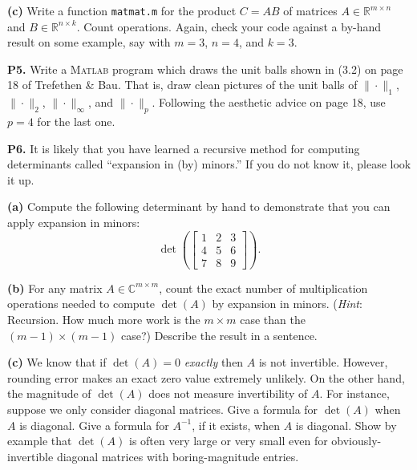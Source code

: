 \documentclass[12pt]{amsart}
\newcommand{\CC}{\mathbb{C}}
\newcommand{\RR}{\mathbb{R}}
\newcommand{\prob}[1]{\bigskip\noindent\textbf{#1.}\quad }
\newcommand{\epart}[1]{\medskip\noindent\textbf{(#1)}\quad }
\newcommand{\Matlab}{\textsc{Matlab}\xspace}
\begin{document}
\epart{c}  Write a function \texttt{matmat.m} for the product $C=AB$ of matrices $A\in \RR^{m\times n}$ and $B\in \RR^{n\times k}$.  Count operations.  Again, check your code against a by-hand result on some example, say with $m=3$, $n=4$, and $k=3$.


\prob{P5}  Write a \Matlab program which draws the unit balls shown in (3.2) on page 18 of Trefethen \& Bau.  That is, draw clean pictures of the unit balls of $\|\cdot\|_1$, $\|\cdot\|_2$, $\|\cdot\|_\infty$, and $\|\cdot\|_p$.  Following the aesthetic advice on page 18, use $p=4$ for the last one.


\clearpage \newpage
\prob{P6}  It is likely that you have learned a recursive method for computing determinants called ``expansion in (by) minors.''  If you do not know it, please look it up.

\epart{a} Compute the following determinant by hand to demonstrate that you can apply expansion in minors:
	$$\det\left(\begin{bmatrix} 1 & 2 & 3 \\ 4 & 5 & 6 \\ 7 & 8 & 9 \end{bmatrix}\right).$$

\epart{b} For any matrix $A\in\CC^{m\times m}$, count the exact number of multiplication operations needed to compute $\det(A)$ by expansion in minors.  (\emph{Hint}: Recursion.  How much more work is the $m\times m$ case than the $(m-1)\times (m-1)$ case?)  Describe the result in a sentence.

\epart{c} We know that if $\det(A)=0$ \emph{exactly} then $A$ is not invertible.  However, rounding error makes an exact zero value extremely unlikely.  On the other hand, the magnitude of $\det(A)$ does not measure invertibility of $A$.  For instance, suppose we only consider diagonal matrices.  Give a formula for $\det(A)$ when $A$ is diagonal.  Give a formula for $A^{-1}$, if it exists, when $A$ is diagonal.  Show by example that $\det(A)$ is often very large or very small even for obviously-invertible diagonal matrices with boring-magnitude entries.
\end{document}
